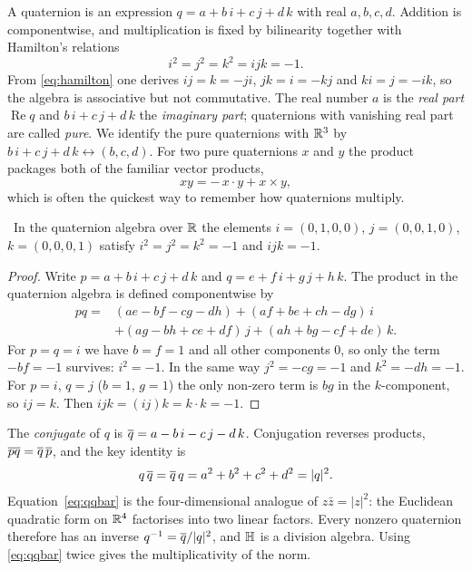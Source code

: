 A quaternion is an expression $q=a+b\,i+c\,j+d\,k$ with real $a,b,c,d$. Addition is componentwise, and multiplication is fixed by bilinearity together with Hamilton's relations
\begin{equation}\label{eq:hamilton}
i^2=j^2=k^2=ijk=-1 .
\end{equation}
From \eqref{eq:hamilton} one derives $ij=k=-ji$, $jk=i=-kj$ and $ki=j=-ik$, so the algebra is associative but not commutative. The real number $a$ is the \emph{real part} $\operatorname{Re}q$ and $b\,i+c\,j+d\,k$ the \emph{imaginary part}; quaternions with vanishing real part are called \emph{pure}. We identify the pure quaternions with $\mathbb{R}^3$ by $b\,i+c\,j+d\,k\leftrightarrow(b,c,d)$. For two pure quaternions $x$ and $y$ the product packages both of the familiar vector products,
\begin{equation}\label{eq:pureproduct}
xy=-\,x\cdot y+x\times y ,
\end{equation}
which is often the quickest way to remember how quaternions multiply.

\begin{theorem}\label{thm:hamilton}\ver\
In the quaternion algebra over $\mathbb{R}$ the elements $i=(0,1,0,0)$, $j=(0,0,1,0)$, $k=(0,0,0,1)$ satisfy $i^2=j^2=k^2=-1$ and $ijk=-1$.
\end{theorem}
\begin{proof}
Write $p=a+b\,i+c\,j+d\,k$ and $q=e+f\,i+g\,j+h\,k$. The product in the quaternion algebra is defined componentwise by
\[
\begin{aligned}
pq={}&(ae-bf-cg-dh)+(af+be+ch-dg)\,i\\
&+(ag-bh+ce+df)\,j+(ah+bg-cf+de)\,k .
\end{aligned}
\]
For $p=q=i$ we have $b=f=1$ and all other components $0$, so only the term $-bf=-1$ survives: $i^2=-1$. In the same way $j^2=-cg=-1$ and $k^2=-dh=-1$. For $p=i$, $q=j$ ($b=1$, $g=1$) the only non-zero term is $bg$ in the $k$-component, so $ij=k$. Then $ijk=(ij)k=k\cdot k=-1$.
\end{proof}


The \emph{conjugate} of $q$ is $\overline{q}=a-b\,i-c\,j-d\,k$. Conjugation reverses products, $\overline{pq}=\overline{q}\,\overline{p}$, and the key identity is
\begin{equation}\label{eq:qqbar}
q\,\overline{q}=\overline{q}\,q=a^2+b^2+c^2+d^2=|q|^2 .
\end{equation}
Equation~\eqref{eq:qqbar} is the four-dimensional analogue of $z\bar z=|z|^2$: the Euclidean quadratic form on $\mathbb{R}^4$ factorises into two linear factors. Every nonzero quaternion therefore has an inverse $q^{-1}=\overline{q}/|q|^2$, and $\mathbb{H}$ is a division algebra. Using \eqref{eq:qqbar} twice gives the multiplicativity of the norm.

